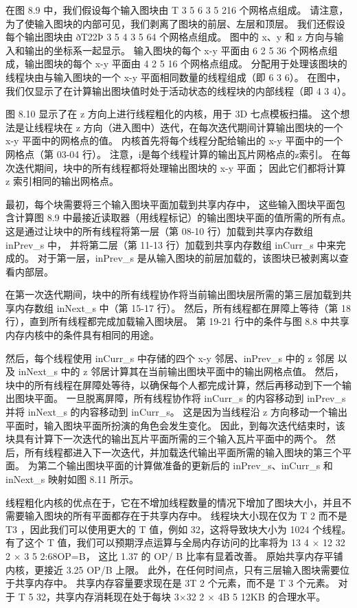 在图 8.9 中，我们假设每个输入图块由 T 3 5 6 3 5 216 个网格点组成。 
请注意，为了使输入图块的内部可见，我们剥离了图块的前层、左层和顶层。 
我们还假设每个输出图块由 ðT22Þ 3 5 4 3 5 64 个网格点组成。 图中的 x、y 和 z 方向与输入和输出的坐标系一起显示。 
输入图块的每个 x-y 平面由 6 2 5 36 个网格点组成，输出图块的每个 x-y 平面由 4 2 5 16 个网格点组成。 
分配用于处理该图块的线程块由与输入图块的一个 x-y 平面相同数量的线程组成（即 6 3 6）。 
在图中，我们仅显示了在计算输出图块值时处于活动状态的线程块的内部线程（即 4 3 4）。

图 8.10 显示了在 z 方向上进行线程粗化的内核，用于 3D 七点模板扫描。 
这个想法是让线程块在 z 方向（进入图中）迭代，在每次迭代期间计算输出图块的一个 x-y 平面中的网格点的值。 
内核首先将每个线程分配给输出的 x-y 平面中的一个网格点（第 03-04 行）。 注意，i是每个线程计算的输出瓦片网格点的z索引。 
在每次迭代期间，块中的所有线程都将处理输出图块的 x-y 平面； 因此它们都将计算 z 索引相同的输出网格点。

最初，每个块需要将三个输入图块平面加载到共享内存中，
这些输入图块平面包含计算图 8.9 中最接近读取器（用线程标记）的输出图块平面的值所需的所有点。 
这是通过让块中的所有线程将第一层（第 08-10 行）加载到共享内存数组 inPrev\_s 中，
并将第二层（第 11-13 行）加载到共享内存数组 inCurr\_s 中来完成的。 
对于第一层，inPrev\_s 是从输入图块的前层加载的，该图块已被剥离以查看内部层。

在第一次迭代期间，块中的所有线程协作将当前输出图块层所需的第三层加载到共享内存数组 inNext\_s 中（第 15-17 行）。 
然后，所有线程都在屏障上等待（第 18 行），直到所有线程都完成加载输入图块层。 
第 19-21 行中的条件与图 8.8 中共享内存内核中的条件具有相同的用途。

然后，每个线程使用 inCurr\_s 中存储的四个 x-y 邻居、inPrev\_s 中的 z 邻居
以及 inNext\_s 中的 z 邻居计算其在当前输出图块平面中的输出网格点值。 
然后，块中的所有线程在屏障处等待，以确保每个人都完成计算，然后再移动到下一个输出图块平面。 
一旦脱离屏障，所有线程协作将 inCurr\_s 的内容移动到 inPrev\_s 并将 inNext\_s 的内容移动到 inCurr\_s。 
这是因为当线程沿 z 方向移动一个输出平面时，输入图块平面所扮演的角色会发生变化。 
因此，到每次迭代结束时，该块具有计算下一次迭代的输出瓦片平面所需的三个输入瓦片平面中的两个。 
然后，所有线程都进入下一次迭代，并加载迭代输出平面所需的输入图块的第三个平面。 
为第二个输出图块平面的计算做准备的更新后的 inPrev\_s、inCurr\_s 和 inNext\_s 映射如图 8.11 所示。

线程粗化内核的优点在于，它在不增加线程数量的情况下增加了图块大小，并且不需要输入图块的所有平面都存在于共享内存中。 
线程块大小现在仅为 T 2 而不是 T3 ，因此我们可以使用更大的 T 值，例如 32，这将导致块大小为 1024 个线程。 
有了这个 T 值，我们可以预期浮点运算与全局内存访问的比率将为 13 4 × 12 32 2 × 3 5 2:68OP=B，
这比 1.37 的 OP/ B 比率有显着改善。 原始共享内存平铺内核，更接近 3.25 OP/B 上限。 
此外，在任何时间点，只有三层输入图块需要位于共享内存中。 共享内存容量要求现在是 3T 2 个元素，而不是 T 3 个元素。 
对于 T 5 32，共享内存消耗现在处于每块 3×32 2 × 4B 5 12KB 的合理水平。

